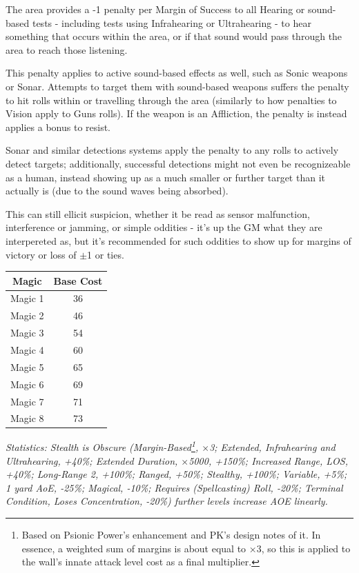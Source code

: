 \begin{multicols}{3}
	The area provides a -1 penalty per Margin of Success to all Hearing or sound-based tests - including tests using Infrahearing or Ultrahearing - to hear something that occurs within the area, or if that sound would pass through the area to reach those listening.
	
	This penalty applies to active sound-based effects as well, such as Sonic weapons or Sonar. Attempts to target them with sound-based weapons suffers the penalty to hit rolls within or travelling through the area (similarly to how penalties to Vision apply to Guns rolls). If the weapon is an Affliction, the penalty is instead applies a bonus to resist.
	
	Sonar and similar detections systems apply the penalty to any rolls to actively detect targets; additionally, successful detections might not even be recognizeable as a human, instead showing up as a much smaller or further target than it actually is (due to the sound waves being absorbed). 
	
	This can still ellicit suspicion, whether it be read as sensor malfunction, interference or jamming, or simple oddities - it's up the GM what they are interpereted as, but it's recommended for such oddities to show up for margins of victory or loss of $\pm$1 or ties.
	
	\begin{center}
		\begin{tabular}{|c|c|}
			\hline
			Magic & Base Cost \\
			\hline
			\hline
			Magic 1 & 36 \\
			Magic 2 & 46 \\
			Magic 3 & 54 \\
			Magic 4 & 60 \\
			Magic 5 & 65 \\
			Magic 6 & 69 \\
			Magic 7 & 71 \\
			Magic 8 & 73 \\
			\hline
		\end{tabular}
	\end{center}
	
	\textcolor{OliveGreen}{\textit{Statistics: Stealth is Obscure (Margin-Based\footnote{Based on Psionic Power’s enhancement and PK’s design notes of it. In essence, a weighted sum of margins is about equal to ×3, so this is applied to the wall’s innate attack level cost as a final multiplier.}, $\times$3; Extended, Infrahearing and Ultrahearing, +40\%; Extended Duration, $\times$5000, +150\%; Increased Range, LOS, +40\%; Long-Range 2, +100\%; Ranged, +50\%; Stealthy, +100\%; Variable, +5\%; 1 yard AoE, -25\%; Magical, -10\%; Requires (Spellcasting) Roll, -20\%; Terminal Condition, Loses Concentration, -20\%) further levels increase AOE linearly.}}
	

\end{multicols}
